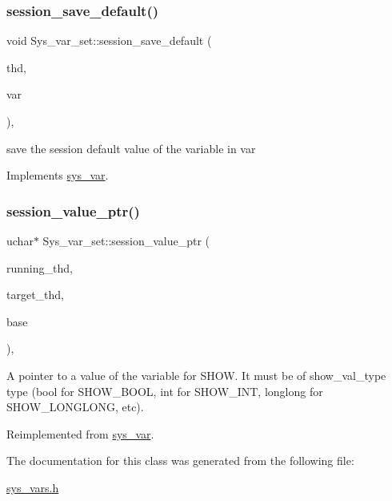 \subsubsection{\texorpdfstring{session\+\_\+save\+\_\+default()}{session\_save\_default()}}
{\footnotesize\ttfamily void Sys\+\_\+var\+\_\+set\+::session\+\_\+save\+\_\+default (\begin{DoxyParamCaption}\item[{T\+HD $\ast$}]{thd,  }\item[{\mbox{\hyperlink{classset__var}{set\+\_\+var}} $\ast$}]{var }\end{DoxyParamCaption})\hspace{0.3cm}{\ttfamily [inline]}, {\ttfamily [virtual]}}

save the session default value of the variable in var 

Implements \mbox{\hyperlink{classsys__var}{sys\+\_\+var}}.

\mbox{\label{classSys__var__set_af0c3fc1d38b4e098896935aa29d35a3a}} 
\subsubsection{\texorpdfstring{session\+\_\+value\+\_\+ptr()}{session\_value\_ptr()}}
{\footnotesize\ttfamily uchar$\ast$ Sys\+\_\+var\+\_\+set\+::session\+\_\+value\+\_\+ptr (\begin{DoxyParamCaption}\item[{T\+HD $\ast$}]{running\+\_\+thd,  }\item[{T\+HD $\ast$}]{target\+\_\+thd,  }\item[{L\+E\+X\+\_\+\+S\+T\+R\+I\+NG $\ast$}]{base }\end{DoxyParamCaption})\hspace{0.3cm}{\ttfamily [inline]}, {\ttfamily [virtual]}}

A pointer to a value of the variable for S\+H\+OW. It must be of show\+\_\+val\+\_\+type type (bool for S\+H\+O\+W\+\_\+\+B\+O\+OL, int for S\+H\+O\+W\+\_\+\+I\+NT, longlong for S\+H\+O\+W\+\_\+\+L\+O\+N\+G\+L\+O\+NG, etc). 

Reimplemented from \mbox{\hyperlink{classsys__var_a3e511591aaf555d2bc2ce40a80b7e899}{sys\+\_\+var}}.



The documentation for this class was generated from the following file\+:\begin{DoxyCompactItemize}
\item 
\mbox{\hyperlink{sys__vars_8h}{sys\+\_\+vars.\+h}}\end{DoxyCompactItemize}
